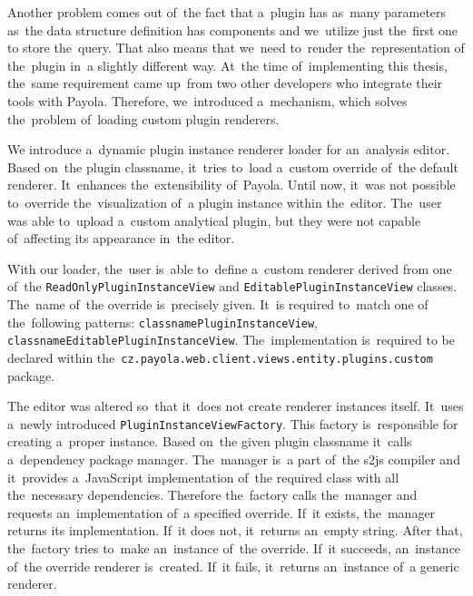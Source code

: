 Another problem comes out of~the fact that a~plugin has as~many parameters as~the data structure definition has components and we~utilize just the~first one 
to store the~query. That also means that we~need to~render the~representation 
of the~plugin in~a slightly different way. At~the time of~implementing this 
thesis, the~same requirement came up~from two other developers who integrate their 
tools with Payola. Therefore, we~introduced a~mechanism, which solves the~problem of~loading custom plugin renderers.

We introduce a~dynamic plugin instance renderer loader for an~analysis editor. 
Based on~the plugin classname, it~tries to~load a~custom override of~the default 
renderer. It~enhances the~extensibility of~Payola. Until now, it~was not 
possible to~override the~visualization of~a plugin instance within the~editor. The~user was able to~upload a~custom analytical plugin, but they were not capable of~affecting its
appearance in~the editor.

\begin{sloppypar}
With our loader, the~user is~able to~define a~custom renderer derived from 
one of~the \texttt{ReadOnlyPluginInstanceView} and \texttt{EditablePluginInstanceView} 
classes. The~name of~the override is~precisely given. It~is required to~match one 
of the~following patterns: \texttt{{classname}PluginInstanceView},
\texttt{{classname}EditablePluginInstanceView}. The~implementation is~required to
be declared within the~\texttt{cz.payola.web.client.views.entity.plugins.custom} package.
\end{sloppypar}

\begin{sloppypar}
The editor was altered so~that it~does not create renderer instances itself. It~uses a~newly introduced \texttt{PluginInstanceViewFactory}. This 
factory is~responsible for creating a~proper instance. Based on~the given plugin 
classname it~calls a~dependency package manager. The~manager is~a part of~the 
s2js compiler and it~provides a~JavaScript implementation of~the required class
with all the~necessary dependencies. Therefore the~factory calls the~manager and 
requests an~implementation of~a specified override. If~it exists, the~manager 
returns its implementation. If~it does not, it~returns an~empty string. After 
that, the~factory tries to~make an~instance of~the override. If~it succeeds, an~instance of~the override renderer is~created. If~it fails, it~returns an~instance of~a generic renderer. 
\end{sloppypar}
 
